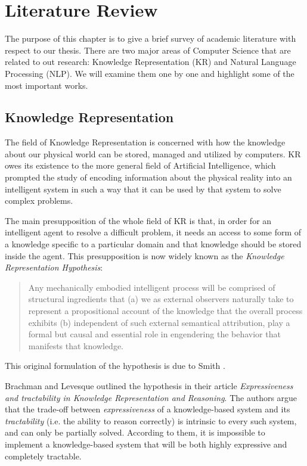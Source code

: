 \chapter{Literature Review}
\label{chap:lr}
The purpose of this chapter is to give a brief survey of academic literature with respect to our thesis.
There are two major areas of Computer Science that are related to out research: Knowledge Representation (KR) and Natural Language
Processing (NLP). We will examine them one by one and highlight some of the most important works.

\section{Knowledge Representation}
The field of Knowledge Representation is concerned with how the knowledge about our physical world can be stored, managed and
utilized by computers. KR owes its existence to the more general field of Artificial Intelligence, which prompted the study of
encoding information about the physical reality into an intelligent system in such a way that it can be used by that system to
solve complex problems.

The main presupposition of the whole field of KR is that, in order for an intelligent agent to resolve a difficult problem, it
needs an access to some form of a knowledge specific to a particular domain and that knowledge should be stored inside the agent.
This presupposition is now widely known as the \textit{Knowledge Representation Hypothesis}:
\begin{quote}
    Any mechanically embodied intelligent process will be comprised of structural ingredients that (a) we as external observers
    naturally take to represent a propositional account of the knowledge that the overall process exhibits (b) independent of such
    external semantical attribution, play a formal but causal and essential role in engendering the behavior that manifests that
    knowledge.
\end{quote}
This original formulation of the hypothesis is due to Smith \cite{smithyp}.

Brachman and Levesque outlined the hypothesis in their article \textit{Expressiveness and tractability in Knowledge Representation
and Reasoning}\cite{krhyp}. The authors argue that the trade-off between \textit{expressiveness} of a knowledge-based system and
its \textit{tractability} (i.e. the ability to reason correctly) is intrinsic to every such system, and can only be partially
solved.  According to them, it is impossible to implement a knowledge-based system that will be both highly expressive and
completely tractable.

